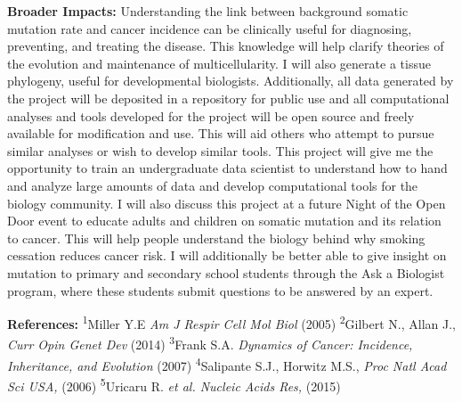 \documentclass[12pt]{article}
\begin{document}
\textbf{Broader Impacts:}
Understanding the link between background somatic mutation rate and cancer incidence can be clinically useful for diagnosing, preventing, and treating the disease. This knowledge will help clarify theories of the evolution and maintenance of multicellularity. I will also generate a tissue phylogeny, useful for developmental biologists. Additionally, all data generated by the project will be deposited in a repository for public use and all computational analyses and tools developed for the project will be open source and freely available for modification and use. This will aid others who attempt to pursue similar analyses or wish to develop similar tools. This project will give me the opportunity to train an undergraduate data scientist to understand how to hand and analyze large amounts of data and develop computational tools for the biology community. I will also discuss this project at a future Night of the Open Door event to educate adults and children on somatic mutation and its relation to cancer. This will help people understand the biology behind why smoking cessation reduces cancer risk. I will additionally be better able to give insight on mutation to primary and secondary school students through the Ask a Biologist program, where these students submit questions to be answered by an expert.

\begin{footnotesize}
\textbf{References:}
\textsuperscript{1}Miller Y.E \textit{Am J Respir Cell Mol Biol} (2005)
\textsuperscript{2}Gilbert N., Allan J., \textit{Curr Opin Genet Dev} (2014)
\textsuperscript{3}Frank S.A. \textit{Dynamics of Cancer: Incidence, Inheritance, and Evolution} (2007)
\textsuperscript{4}Salipante S.J., Horwitz M.S., \textit{Proc Natl Acad Sci USA,} (2006)
\textsuperscript{5}Uricaru R. \textit{et al. Nucleic Acids Res,} (2015)
\end{footnotesize}
\end{document}
